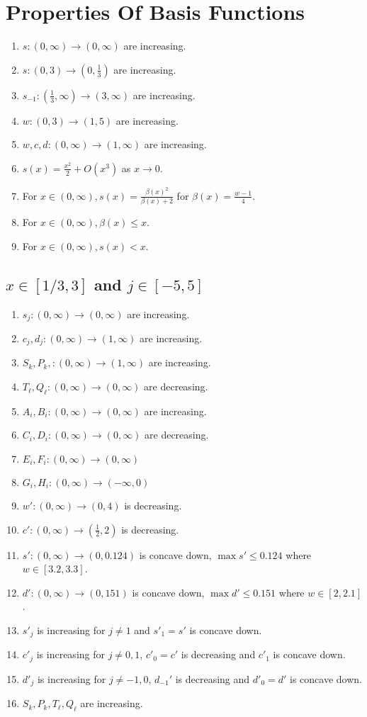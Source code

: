 \documentclass{article}
\begin{document}
\newpage
\section{Properties Of Basis Functions}
\begin{enumerate}[label=(\arabic*)]
    \item $s:(0,\infty)\to(0,\infty)$ are increasing.
    \item $s:(0,3)\to(0,\frac{1}{3})$ are increasing.
    \item $s_{-1}:(\frac{1}{3},\infty)\to(3,\infty)$ are increasing.
    \item $w:(0,3)\to(1,5)$ are increasing.
    \item $w,c,d:(0,\infty)\to(1,\infty)$ are increasing.
    \item $s(x) = \frac{x^2}{2}+O(x^3)$ as $x\to 0$.
    \item For $x\in(0,\infty), s(x)=\frac{\beta(x)^2}{\beta(x)+2}$ for $\beta(x)=\frac{w-1}{4}$.
    \item For $x\in(0,\infty), \beta(x)\le x$. 
    \item For $x\in(0,\infty), s(x)< x$. 
\end{enumerate}

\subsection{$x\in[1/3, 3]$ and $j\in[-5, 5]$}
\begin{enumerate}[label=(\arabic*)]
    \item $s_j:(0,\infty)\to(0,\infty)$ are increasing.
    \item $c_j,d_j:(0,\infty)\to(1,\infty)$ are increasing.
    \item $S_k, P_k,:(0,\infty)\to(1,\infty)$ are increasing.
    \item $T_\ell, Q_\ell:(0,\infty)\to(0,\infty)$ are decreasing.
    \item $A_i, B_i:(0,\infty)\to(0,\infty)$ are increasing.
    \item $C_i, D_i:(0,\infty)\to(0,\infty)$ are decreasing.
    \item $E_i, F_i:(0,\infty)\to(0,\infty)$
    \item $G_i, H_i:(0,\infty)\to(-\infty,0)$
    \item $w':(0,\infty)\to(0,4)$ is decreasing.
    \item $c':(0,\infty)\to(\frac{1}{2},2)$ is decreasing.
    \item $s':(0,\infty)\to(0,0.124)$ is concave down, $\max s' \le 0.124$ where $w\in[3.2, 3.3]$.
    \item $d':(0,\infty)\to(0,151)$ is concave down, $\max d' \le 0.151$ where $w\in[2, 2.1]$.
    \item $s'_j$ is increasing for $j\neq 1$ and $s'_1 = s'$ is concave down.
    \item $c'_j$ is increasing for $j\neq0, 1$, $c'_0=c'$ is decreasing and $c'_1$ is concave down.
    \item $d'_j$ is increasing for $j\neq-1, 0$, $d_{-1}'$ is decreasing and $d'_0 = d'$ is concave down.
    \item $S_k, P_k, T_\ell, Q_\ell$ are increasing.
\end{enumerate}
\end{document}
